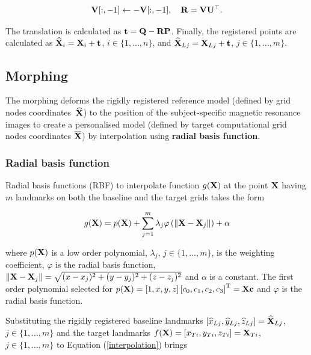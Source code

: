 \begin{equation}
{\bf V}[:, -1] \gets -{\bf V}[:, -1], \quad {\bf R}={\bf V}{\bf U}^\top\mbox{.}
\end{equation}

The translation is calculated as ${\bf t}={\bf Q}-{\bf R}{\bf P}$. Finally, the registered points are calculated as $\widehat{\bf X}_i={\bf X}_i+{\bf t}$, $i\in\{1,\dots,n\}$, and $\widehat{\bf X}_{Lj}={\bf X}_{Lj}+{\bf t}$, $j\in\{1,\dots,m\}$.

\subsection*{Morphing}
The morphing deforms the rigidly registered reference model (defined by grid nodes coordinates~$\widehat{\bf X}$) to the position of the subject-specific magnetic resonance images to create a personalised model (defined by target computational grid nodes coordinates $\overline{\bf X}$) by interpolation using {\bf radial basis function}.

\subsubsection*{Radial basis function}
Radial basis functions (RBF) to interpolate function $g({\bf X})$ at the point ${\bf X}$ having $m$ landmarks on both the baseline and the target grids takes the form~\cite{Carr:2007}

\begin{equation}
\label{interpolation}
g({\bf X})=p({\bf X})+\sum\limits_{j=1}^m\lambda_j\varphi\left(\|{\bf X}-{\bf X}_j\|\right)+\alpha
\end{equation}

where $p({\bf X})$ is a low order polynomial, $\lambda_j$, $j\in\{1,\dots,m\}$, is the weighting coefficient, $\varphi$ is the radial basis function, $\|{\bf X}-{\bf X}_j\|=\sqrt{(x-x_j)^2+(y-y_j)^2+(z-z_j)^2}$ and $\alpha$ is a constant. The first order polynomial selected for $p({\bf X})=\left[1,x,y,z\right]\left[c_0,c_1,c_2,c_3\right]^{\mathrm{T}}={\bf X}{\bf c}$ and $\varphi$ is the radial basis function.

Substituting the rigidly registered baseline landmarks $\left[\widehat{x}_{Lj},\widehat{y}_{Lj},\widehat{z}_{Lj}\right]=\widehat{\bf X}_{Lj}$, $j\in\{1,\dots,m\}$ and the target landmarks $f({\bf X})=\left[x_{Ti},y_{Ti},z_{Ti}\right]={\bf X}_{Ti}$, $j\in\{1,\dots,m\}$ to Equation (\ref{interpolation}) brings

